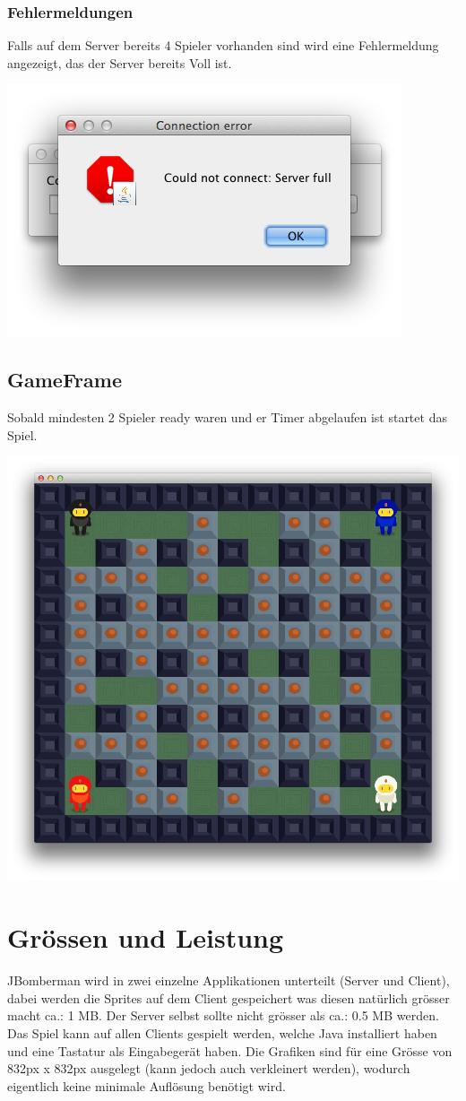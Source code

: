 \documentclass[11pt]{scrartcl}
\begin{document}
\subsubsection{Fehlermeldungen}
Falls auf dem Server bereits 4 Spieler vorhanden sind wird eine Fehlermeldung 
angezeigt, das der Server bereits Voll ist.

\includegraphics[scale=0.45]{ErrorServerFull}
\newpage
\subsection{GameFrame}
Sobald mindesten 2 Spieler ready waren und er Timer abgelaufen ist startet das 
Spiel.

\includegraphics[scale=0.45]{GameFrame}

\section{Grössen und Leistung}
JBomberman wird in zwei einzelne Applikationen unterteilt (Server und Client), dabei werden 
die Sprites auf dem Client gespeichert was diesen natürlich grösser macht ca.: 1 MB. 
Der Server selbst sollte nicht grösser als ca.: 0.5 MB werden.
Das Spiel kann auf allen Clients gespielt werden, welche Java installiert haben 
und eine Tastatur als Eingabegerät haben.
Die Grafiken sind für eine Grösse von 832px x 832px ausgelegt (kann jedoch auch 
verkleinert werden),
 wodurch eigentlich keine minimale Auflösung benötigt wird.
\end{document}
